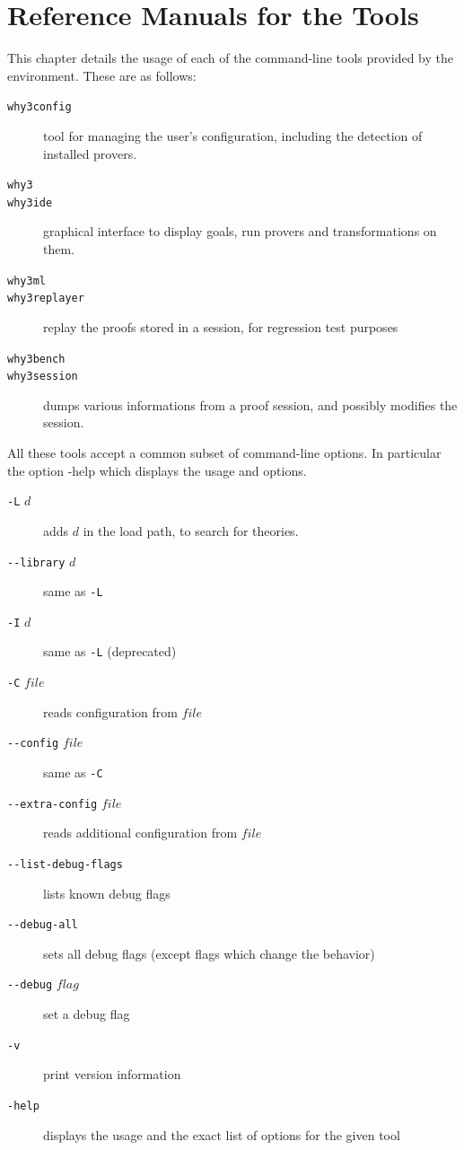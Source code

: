 \chapter{Reference Manuals for the \why Tools}
\label{chap:manpages}

This chapter details the usage of each of the command-line tools
provided by the \why environment. These are as follows:
\begin{description}
\item[\texttt{why3config}] tool for managing the user's configuration,
  including the detection of installed provers.
\item[\texttt{why3}] \todo{}
\item[\texttt{why3ide}] graphical interface to display goals, run
  provers and transformations on them.
\item[\texttt{why3ml}] \todo{}
\item[\texttt{why3replayer}] replay the proofs stored in a session,
  for regression test purposes
\item[\texttt{why3bench}] \todo{}
\item[\texttt{why3session}] dumps various informations from a proof
  session, and possibly modifies the session.
\end{description}

All these tools accept a common subset of command-line options. In
particular the option -help which displays the usage and options.
\begin{description}
\item[\texttt{-L} $d$]
  adds $d$ in the load path, to search for theories.
\item[\texttt{-{}-library} $d$]
  same as \verb|-L|
\item[\texttt{-I} $d$]
  same as \verb|-L| (deprecated)
\item[\texttt{-C} $file$]
  reads configuration from $file$
\item[\texttt{-{}-config} $file$]
  same as \verb|-C|
\item[\texttt{-{}-extra-config} $file$]
  reads additional configuration from $file$
\item[\texttt{-{}-list-debug-flags}]
  lists known debug flags
\item[\texttt{-{}-debug-all}]
  sets all debug flags (except flags which change the behavior)
\item[\texttt{-{}-debug} $flag$]
  set a debug flag
\item[\texttt{-v}]
  print version information
\item[\texttt{-help}]
  displays the usage and the exact list of options for the given tool
\end{description}

